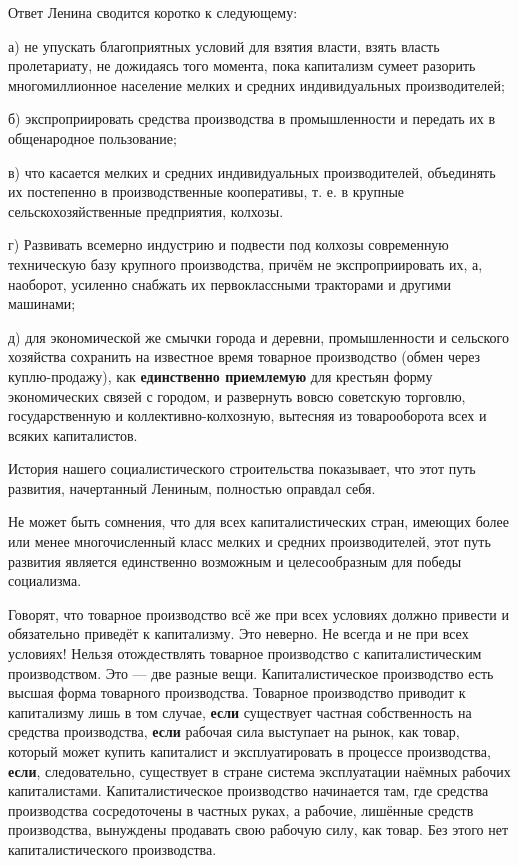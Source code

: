 \documentclass[12pt, a4paper, openany]{book}
\begin{document}
Ответ Ленина сводится коротко к следующему:



а) не упускать благоприятных условий для взятия власти, взять власть пролетариату, не дожидаясь того момента, пока капитализм сумеет разорить многомиллионное население мелких и средних индивидуальных производителей;



б) экспроприировать средства производства в промышленности и передать их в общенародное пользование;



в) что касается мелких и средних индивидуальных производителей, объединять их постепенно в производственные кооперативы, т. е. в крупные сельскохозяйственные предприятия, колхозы.



г) Развивать всемерно индустрию и подвести под колхозы современную техническую базу крупного производства, причём не экспроприировать их, а, наоборот, усиленно снабжать их первоклассными тракторами и другими машинами;



д) для экономической же смычки города и деревни, промышленности и сельского хозяйства сохранить на известное время товарное производство (обмен через куплю-продажу), как \textbf{единственно приемлемую} для крестьян форму экономических связей с городом, и развернуть вовсю советскую торговлю, государственную и коллективно-колхозную, вытесняя из товарооборота всех и всяких капиталистов.



История нашего социалистического строительства показывает, что этот путь развития, начертанный Лениным, полностью оправдал себя.



Не может быть сомнения, что для всех капиталистических стран, имеющих более или менее многочисленный класс мелких и средних производителей, этот путь развития является единственно возможным и целесообразным для победы социализма.



Говорят, что товарное производство всё же при всех условиях должно привести и обязательно приведёт к капитализму. Это неверно. Не всегда и не при всех условиях! Нельзя отождествлять товарное производство с капиталистическим производством. Это — две разные вещи. Капиталистическое производство есть высшая форма товарного производства. Товарное производство приводит к капитализму лишь в том случае, \textbf{если} существует частная собственность на средства производства, \textbf{если} рабочая сила выступает на рынок, как товар, который может купить капиталист и эксплуатировать в процессе производства, \textbf{если}, следовательно, существует в стране система эксплуатации наёмных рабочих капиталистами. Капиталистическое производство начинается там, где средства производства сосредоточены в частных руках, а рабочие, лишённые средств производства, вынуждены продавать свою рабочую силу, как товар. Без этого нет капиталистического производства.
\end{document}
